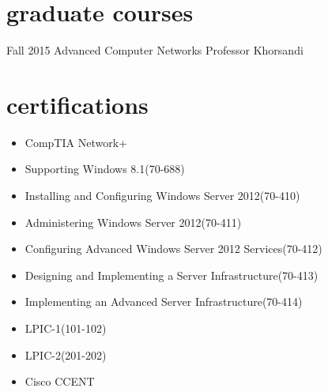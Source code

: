 \documentclass[]{friggeri-cv} %
\begin{document}

\section{graduate courses}

\begin{entrylist}

\entry
{Fall 2015}
{Advanced Computer Networks}
{Professor Khorsandi}
{}


\end{entrylist}


\section{certifications}
\begin{itemize}
	\item CompTIA Network+
	\item Supporting Windows 8.1(70-688)
	\item Installing and Configuring Windows Server 2012(70-410)
	\item Administering Windows Server 2012(70-411)
	\item Configuring Advanced Windows Server 2012 Services(70-412)
	\item Designing and Implementing a Server Infrastructure(70-413)
	\item Implementing an Advanced Server Infrastructure(70-414)
	\item LPIC-1(101-102)
	\item LPIC-2(201-202)
	\item Cisco CCENT
\end{itemize}
\end{document}
